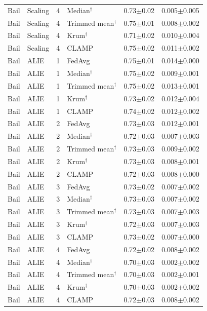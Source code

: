 \begin{longtable}{llclcc}
Bail & Scaling & 4 & Median$^\dagger$ & 0.73$\pm$0.02 & 0.005$\pm$0.005 \\
Bail & Scaling & 4 & Trimmed mean$^\dagger$ & 0.75$\pm$0.01 & 0.008$\pm$0.002 \\
Bail & Scaling & 4 & Krum$^\dagger$ & 0.71$\pm$0.02 & 0.010$\pm$0.004 \\
Bail & Scaling & 4 & CLAMP & 0.75$\pm$0.02 & 0.011$\pm$0.002 \\
Bail & ALIE & 1 & FedAvg & 0.75$\pm$0.01 & 0.014$\pm$0.000 \\
Bail & ALIE & 1 & Median$^\dagger$ & 0.75$\pm$0.02 & 0.009$\pm$0.001 \\
Bail & ALIE & 1 & Trimmed mean$^\dagger$ & 0.75$\pm$0.02 & 0.013$\pm$0.001 \\
Bail & ALIE & 1 & Krum$^\dagger$ & 0.73$\pm$0.02 & 0.012$\pm$0.004 \\
Bail & ALIE & 1 & CLAMP & 0.74$\pm$0.02 & 0.012$\pm$0.002 \\
Bail & ALIE & 2 & FedAvg & 0.73$\pm$0.03 & 0.012$\pm$0.001 \\
Bail & ALIE & 2 & Median$^\dagger$ & 0.72$\pm$0.03 & 0.007$\pm$0.003 \\
Bail & ALIE & 2 & Trimmed mean$^\dagger$ & 0.73$\pm$0.03 & 0.009$\pm$0.002 \\
Bail & ALIE & 2 & Krum$^\dagger$ & 0.73$\pm$0.03 & 0.008$\pm$0.001 \\
Bail & ALIE & 2 & CLAMP & 0.72$\pm$0.03 & 0.008$\pm$0.000 \\
Bail & ALIE & 3 & FedAvg & 0.73$\pm$0.02 & 0.007$\pm$0.002 \\
Bail & ALIE & 3 & Median$^\dagger$ & 0.73$\pm$0.03 & 0.007$\pm$0.002 \\
Bail & ALIE & 3 & Trimmed mean$^\dagger$ & 0.73$\pm$0.03 & 0.007$\pm$0.003 \\
Bail & ALIE & 3 & Krum$^\dagger$ & 0.72$\pm$0.03 & 0.007$\pm$0.003 \\
Bail & ALIE & 3 & CLAMP & 0.73$\pm$0.02 & 0.007$\pm$0.000 \\
Bail & ALIE & 4 & FedAvg & 0.72$\pm$0.02 & 0.008$\pm$0.002 \\
Bail & ALIE & 4 & Median$^\dagger$ & 0.70$\pm$0.03 & 0.002$\pm$0.002 \\
Bail & ALIE & 4 & Trimmed mean$^\dagger$ & 0.70$\pm$0.03 & 0.002$\pm$0.001 \\
Bail & ALIE & 4 & Krum$^\dagger$ & 0.70$\pm$0.03 & 0.002$\pm$0.002 \\
Bail & ALIE & 4 & CLAMP & 0.72$\pm$0.03 & 0.008$\pm$0.002 \\

\end{longtable}
